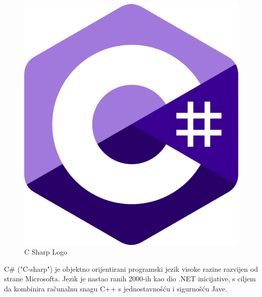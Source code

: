 \documentclass[diplomskirad]{fer}
\begin{document}
    \begin{figure}[H]
        \centering
        \includegraphics[scale=0.1]{images/c-sharp}
        \caption{
            C Sharp Logo \cite{cSharpLogo}
        }
        \label{fig:cSharpLogo}
    \end{figure}

    C\# ("C-sharp") je objektno orijentirani programski jezik visoke razine razvijen od strane Microsofta.
    Jezik je nastao ranih 2000-ih kao dio .NET inicijative, s ciljem da kombinira računalnu snagu C++ s jednostavnošću i sigurnošću Jave.
\end{document}
